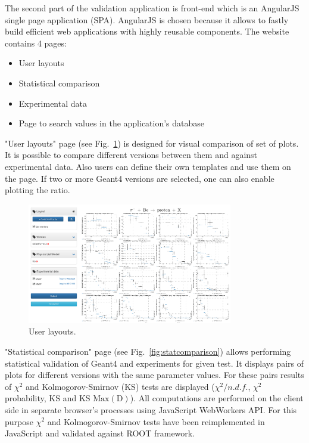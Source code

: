The second part of the validation application is front-end which is an AngularJS single page application (SPA).
AngularJS is chosen because it allows to fastly build efficient web applications with highly reusable components.
The website contains 4 pages:

\begin{itemize}
    \item User layouts
    \item Statistical comparison
    \item Experimental data
    \item Page to search values in the application's database
\end{itemize}

"User layouts" page (see Fig.~\ref{fig:layouts}) is designed for visual comparison of set of plots. It is possible to compare different versions between them and against experimental data. Also users can define their own templates and use them on the page. 
If two or more Geant4 versions are selected, one can also enable plotting the ratio.

\begin{figure}[h]
    \centering
    \includegraphics[width=0.8\textwidth,clip]{layouts.png}
    \caption{User layouts.}
    \label{fig:layouts}
\end{figure}

"Statistical comparison" page (see Fig.~\ref{fig:statcomparison}) allows performing statistical validation of Geant4 and experiments for given test. It displays pairs of plots for different versions with the same parameter values. For these pairs results of $\chi^2$ and Kolmogorov-Smirnov (KS) tests are displayed ($\chi^2/n.d.f.$, $\chi^2$ probability, KS and KS $\mathrm{Max(D)}$). All computations are performed on the client side in separate browser's processes using JavaScript WebWorkers API.
For this purpose $\chi^2$ and Kolmogorov-Smirnov tests have been reimplemented in JavaScript and validated against ROOT framework.

